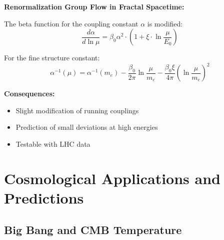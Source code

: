 \documentclass[12pt,a4paper]{article}
\newcommand{\xipar}{\xi}
\begin{document}
	\begin{relation}
		\textbf{Renormalization Group Flow in Fractal Spacetime:}
		
		The beta function for the coupling constant $\alpha$ is modified:
		\begin{equation}
			\frac{d\alpha}{d\ln\mu} = \beta_0 \alpha^2 \cdot \left(1 + \xipar \cdot \ln\frac{\mu}{E_0}\right)
		\end{equation}
		
		For the fine structure constant:
		\begin{equation}
			\alpha^{-1}(\mu) = \alpha^{-1}(m_e) - \frac{\beta_0}{2\pi} \ln\frac{\mu}{m_e} - \frac{\beta_0 \xipar}{4\pi} \left(\ln\frac{\mu}{m_e}\right)^2
		\end{equation}
		
		\textbf{Consequences:}
		\begin{itemize}
			\item Slight modification of running couplings
			\item Prediction of small deviations at high energies
			\item Testable with LHC data
		\end{itemize}
	\end{relation}
	
	\section{Cosmological Applications and Predictions}
	
	\subsection{Big Bang and CMB Temperature}
	
\end{document}
